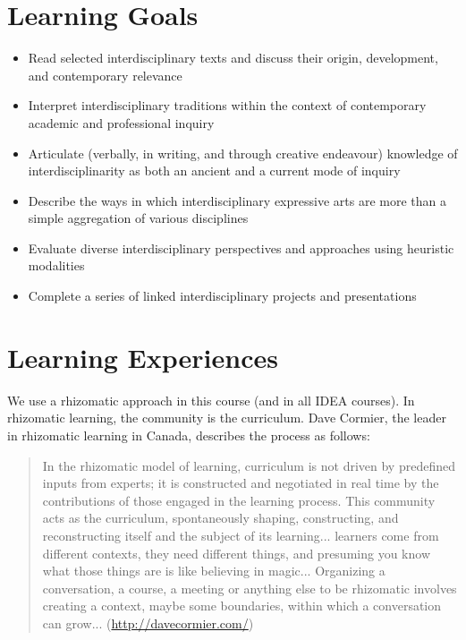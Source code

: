 \documentclass[letterpaper,10pt,headsepline]{scrreprt}
\begin{document}
\section{Learning Goals}
\begin{itemize}

\item Read selected interdisciplinary texts and discuss their origin, development, and contemporary relevance
\item Interpret interdisciplinary traditions within the context of contemporary academic and professional inquiry
\item Articulate (verbally, in writing, and through creative endeavour) knowledge of interdisciplinarity as both an ancient and a current mode of inquiry
\item Describe the ways in which interdisciplinary expressive arts are more than a simple aggregation of various disciplines
\item Evaluate diverse interdisciplinary perspectives and approaches using heuristic modalities
\item Complete a series of linked interdisciplinary projects and presentations

\end{itemize}
\clearpage

\section{Learning Experiences}
We use a rhizomatic approach in this course (and in all IDEA courses). In rhizomatic learning, the community is the curriculum. Dave Cormier, the leader in rhizomatic learning in Canada, describes the process as follows:

\begin{quote}
In the rhizomatic model of learning, curriculum is not driven by predefined inputs from experts; it is constructed and negotiated in real time by the contributions of those engaged in the learning process. This community acts as the curriculum, spontaneously shaping, constructing, and reconstructing itself and the subject of its learning... learners come from different contexts, they need different things, and presuming you know what those things are is like believing in magic... Organizing a conversation, a course, a meeting or anything else to be rhizomatic involves creating a context, maybe some boundaries, within which a conversation can grow... (\url{http://davecormier.com/})
\end{quote}
\end{document}
